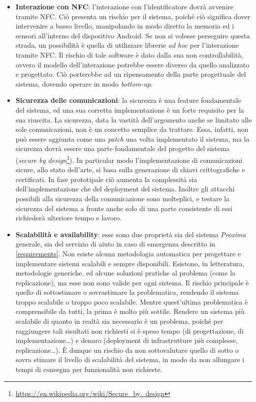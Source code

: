 \documentclass[a4paper,12pt]{report}
\begin{document}
\begin{itemize}
	\item \textbf{Interazione con NFC}: l'interazione con l'identificatore dovrà avvenire tramite NFC. Ciò presenta un rischio per il sistema, poiché ciò significa dover intervenire a basso livello, manipolando in modo diretto la memoria ed i sensori all'interno del dispositivo Android. Se non si volesse perseguire questa strada, un possibilità è quella di utilizzare librerie \emph{ad hoc} per l'interazione tramite NFC. Il rischio di tale software è dato dalla sua non controllabilità, ovvero il modello dell'interazione potrebbe essere diverso da quello analizzato e progettato. Ciò porterebbe ad un ripensamento della parte progettuale del sistema, dovendo operare in modo \emph{bottom-up}.
	\item \textbf{Sicurezza delle comunicazioni}: la sicurezza è una feature fondamentale del sistema, ed una sua corretta implementazione è un forte requisito per la sua riuscita. La sicurezza, data la vastità dell'argomento anche se limitato alle sole comunicazioni, non è un concetto semplice da trattare. Essa, infatti, non può essere aggiunta come una \emph{patch} una volta implementato il sistema, ma la sicurezza dovrà essere una parte fondamentale del progetto del sistema (\emph{secure by design}\footnote{\url{https://en.wikipedia.org/wiki/Secure_by_design}}). In particolar modo l'implementazione di comunicazioni sicure, allo stato dell'arte, si basa sulla generazione di chiavi crittografiche e certificati. In fase prototipale ciò aumenta la complessità sia dell'implementazione che del deployment del sistema. Inoltre gli attacchi possibili alla sicurezza della comunicazione sono molteplici, e testare la sicurezza del sistema a fronte anche solo di una parte consistente di essi richiederà ulteriore tempo e lavoro.
	\item \textbf{Scalabilità e availability}: esse sono due proprietà sia del sistema \emph{Proxima} generale, sia del servizio di aiuto in caso di emergenza descritto in \autoref{requirements}. Non esiste alcuna metodologia automatica per progettare e implementare sistemi scalabili e sempre disponibili. Esistono, in letteratura, metodologie generiche, ed alcune soluzioni pratiche al problema (come la replicazione), ma esse non sono valide per ogni sistema. Il rischio principale è quello di sottostimare o sovrastimare la problematica, rendendo il sistema troppo scalabile o troppo poco scalabile. Mentre quest'ultima problematica è comprensibile da tutti, la prima è molto più sottile. Rendere un sistema più scalabile di quanto in realtà sia necessario è un problema, poiché per raggiungere tali risultati non richiesti si è speso tempo (di progettazione, di implementazione\dots) e denaro (deployment di infrastrutture più complesse, replicazione\dots). \`{E} dunque un rischio da non sottovalutare quello di sotto o sovra stimare il livello di scalabilità del sistema, in modo da non allungare i tempi di consegna per funzionalità non richieste. 

\end{itemize}
\end{document}
